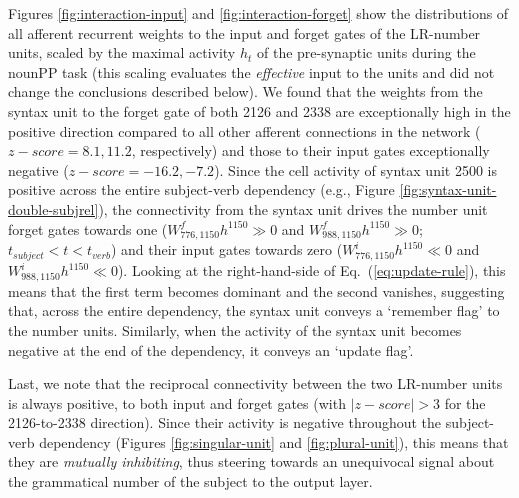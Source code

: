 Figures \ref{fig:interaction-input} and \ref{fig:interaction-forget}
show the distributions of all afferent recurrent weights to the input
and forget gates of the LR-number units, scaled by the maximal activity
$h_t$ of the pre-synaptic units during the nounPP task (this scaling evaluates
the \textit{effective} input to the units and did not change the conclusions described below). We found that the weights from the
syntax unit to the forget gate of both \unit{2}{126} and \unit{2}{338}
are exceptionally high in the positive direction compared to all other
afferent connections in the network ($z-score=8.1, 11.2$, respectively) and
those to their input gates exceptionally negative ($z-score=-16.2,
-7.2$). Since the cell activity of syntax unit \unit{2}{500} is
positive across the entire subject-verb dependency (e.g., Figure
\ref{fig:syntax-unit-double-subjrel}), the connectivity from the
syntax unit drives the number unit forget gates towards one
($W^f_{776, 1150}h^{1150}\gg0$ and $W^f_{988, 1150}h^{1150}\gg0$; $t_{subject}<t<t_{verb}$) and their input gates towards zero
($W^i_{776, 1150}h^{1150}\ll0$ and $W^i_{988, 1150}h^{1150}\ll0$). Looking at the right-hand-side of
Eq.~(\ref{eq:update-rule}), this means that the first term becomes
dominant and the second vanishes, suggesting that, across the entire
dependency, the syntax unit conveys a `remember flag' to the number
units. Similarly, when the activity of the syntax unit becomes
negative at the end of the dependency, it conveys an `update flag'.

Last, we note that the reciprocal connectivity between the two
LR-number units is always positive, to both input and forget
gates (with $|z-score|>3$ for the \unit{2}{126}-to-\unit{2}{338} direction). Since
their activity is negative throughout the subject-verb dependency
(Figures \ref{fig:singular-unit} and \ref{fig:plural-unit}), this means
that they are \textit{mutually inhibiting}, thus steering towards an
unequivocal signal about the grammatical number of the subject to the
output layer.

